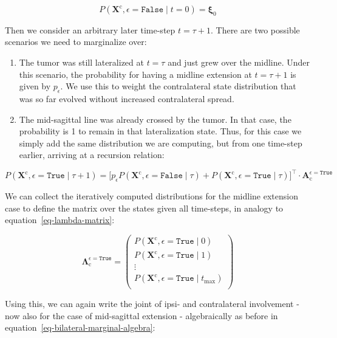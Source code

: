 \documentclass[
  sn-mathphys-num,
]{sn-jnl}
\providecommand{\tightlist}{%
  \setlength{\itemsep}{0pt}\setlength{\parskip}{0pt}}\usepackage{longtable,booktabs,array}
\begin{document}
\[
P \left( \mathbf{X}^\text{c}, \epsilon=\texttt{False} \mid t=0 \right) = \boldsymbol{\xi}_0
\]

Then we consider an arbitrary later time-step \(t=\tau+1\). There are
two possible scenarios we need to marginalize over:

\begin{enumerate}
\def\labelenumi{\arabic{enumi}.}
\tightlist
\item
  The tumor was still lateralized at \(t=\tau\) and just grew over the
  midline. Under this scenario, the probability for having a midline
  extension at \(t=\tau+1\) is given by \(p_\epsilon\). We use this to
  weight the contralateral state distribution that was so far evolved
  without increased contralateral spread.
\item
  The mid-sagittal line was already crossed by the tumor. In that case,
  the probability is 1 to remain in that lateralization state. Thus, for
  this case we simply add the same distribution we are computing, but
  from one time-step earlier, arriving at a recursion relation:
\end{enumerate}

\[
P \left( \mathbf{X}^\text{c}, \epsilon=\texttt{True} \mid \tau + 1 \right) = \big[ p_\epsilon P \left( \mathbf{X}^\text{c}, \epsilon=\texttt{False} \mid \tau \right) + P \left( \mathbf{X}^\text{c}, \epsilon=\texttt{True} \mid \tau \right) \big]^\top \cdot \mathbf{A}_\text{c}^{\epsilon=\texttt{True}}
\]

We can collect the iteratively computed distributions for the midline
extension case to define the matrix over the states given all
time-steps, in analogy to equation~\ref{eq-lambda-matrix}:

\[
\boldsymbol{\Lambda}_\text{c}^{\epsilon=\texttt{True}} = \begin{pmatrix}
P \left( \mathbf{X}^\text{c}, \epsilon=\texttt{True} \mid 0 \right) \\
P \left( \mathbf{X}^\text{c}, \epsilon=\texttt{True} \mid 1 \right) \\
\vdots \\
P \left( \mathbf{X}^\text{c}, \epsilon=\texttt{True} \mid t_\text{max} \right) \\
\end{pmatrix}
\]

Using this, we can again write the joint of ipsi- and contralateral
involvement - now also for the case of mid-sagittal extension -
algebraically as before in equation~\ref{eq-bilateral-marginal-algebra}:
\end{document}
